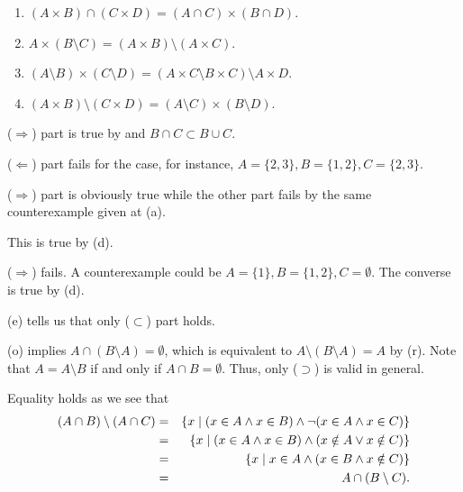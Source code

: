 \documentclass[a4paper,12pt]{article}
\begin{document}
\begin{exe}
\begin{enumerate}
		\item
		      \( (A\times B) \cap (C \times D) = (A \cap C) \times (B \cap D) \).
		      
		\item
		      \( A \times (B \setminus C) = (A \times B) \setminus (A \times C) \).
		      
		\item
		      \( (A \setminus B) \times  (C \setminus D) = (A \times C \setminus B \times C) \setminus A \times D \).
		      
		\item
		      \( (A \times B) \setminus  (C \times D)
		      = (A \setminus C) \times (B \setminus D)\).
	\end{enumerate}
\end{exe}\begin{sol}\leavevmode \par
	(\( \Rightarrow \)) part is true by 
	and \( B \cap C \subset B \cup C \).\leavevmode \par
	(\( \Leftarrow \)) part fails for the case, for instance,
	\( A=\{2,3\},B=\{1,2\},C=\{2,3\} \).
	
	(\( \Rightarrow \)) part is obviously true while the other part fails by the same counterexample given at (a).
	
	This is true by  (d).
	
	(\( \Rightarrow \)) fails. A counterexample could be
	\( A=\{1\},B=\{1,2\},C=\emptyset\).
	The converse is true by  (d).
	
	 (e) tells us that
	only (\( \subset \)) part holds.
	
	 (o) implies
	\( A \cap (B \setminus A) = \emptyset \),
	which is equivalent to
	\( A \setminus (B \setminus A) =A \)
	by  (r).
	Note that \( A = A \setminus B \) if and only if \( A \cap B = \emptyset \).
	Thus, only (\( \supset \)) is valid in general.
	
	Equality holds as we see that
	\begin{eqnarray*}
		(A\cap B)\setminus (A\cap C)
		&=&
		\left\{ x \;|\;	( x \in A \wedge  x \in B)
		\wedge
		\neg( x \in A \wedge  x \in C)
		\right\}\\
		&=&
		\left\{ x \;|\;	( x \in A \wedge  x \in B)
		\wedge
		( x \notin A \vee x \notin C)
		\right\}\\
		&=&
		\left\{ x \;|\;	 x \in A \wedge  (x \in B \wedge x \notin C) \right\}\\
		&=&
		A \cap (B \setminus C).
	\end{eqnarray*}
	

\end{sol}
\end{document}
